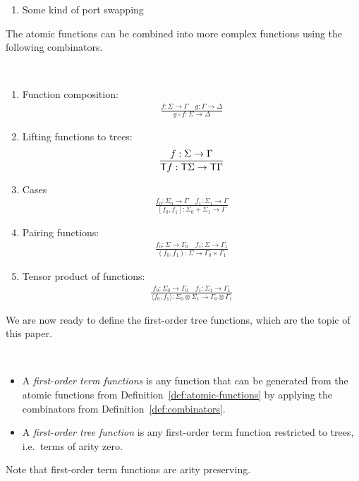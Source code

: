 \begin{definition}
\begin{enumerate}
\item Some kind of port swapping
\end{enumerate}
\end{definition}



The atomic functions can be combined into more complex functions using the following combinators.
\begin{definition}
     [Combinators] \label{def:combinators} \ 
    \begin{enumerate}
    \item Function composition:
    \begin{align*}
    \frac{f : \Sigma \to \Gamma \quad g : \Gamma \to \Delta} {g \circ f : \Sigma \to \Delta}
\end{align*}

\item Lifting functions to trees:
\begin{align*}
    \frac{f : \Sigma \to \Gamma} {\mathsf T f : \mathsf T \Sigma \to \mathsf T \Gamma}
\end{align*}
\item Cases
\begin{align*}
    \frac{f_0 : \Sigma_0 \to \Gamma \quad f_1 : \Sigma_1 \to \Gamma} {[f_0,f_1] : \Sigma_0 + \Sigma_1 \to \Gamma}
\end{align*}

\item Pairing functions:
\begin{align*}
    \frac{f_0 : \Sigma \to \Gamma_0 \quad f_1 : \Sigma \to \Gamma_1} {(f_0,f_1) : \Sigma \to \Gamma_0 \times \Gamma_1}
\end{align*}

\item Tensor product of functions:
\begin{align*}
    \frac{f_0 : \Sigma_0 \to \Gamma_0 \quad f_1 : \Sigma_1 \to \Gamma_1} {\langle f_0,f_1 \rangle : \Sigma_0 \otimes \Sigma_1 \to \Gamma_0 \otimes \Gamma_1}
\end{align*}
\end{enumerate}
\end{definition}

We are now ready to define the first-order tree functions, which are the topic of this paper. 

\begin{definition} \label{def:fo-tree-functions} \ 
    \begin{itemize}
        \item A \emph{first-order term functions} is any function that can be  generated from the atomic functions from Definition~\ref{def:atomic-functions} by applying the  combinators from Definition~\ref{def:combinators}.
        \item  A \emph{first-order tree function} is any first-order term function restricted to trees, i.e.~terms of arity zero.
    \end{itemize}    
\end{definition}
Note that first-order term functions are arity preserving. 

